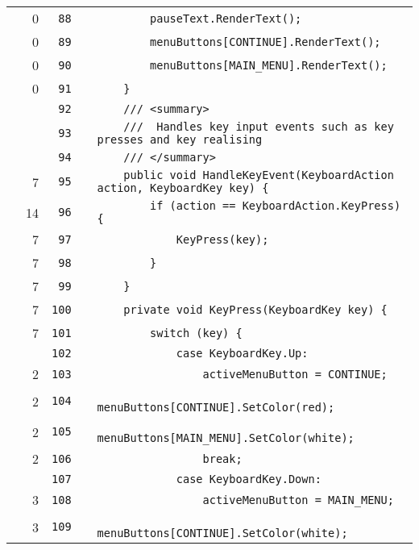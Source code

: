 \documentclass[a4paper,landscape,10pt]{article}
\begin{document}
\begin{longtable}[l]{lrrll}
\cellcolor{red} & 0 & \verb~88~ & & \verb~        pauseText.RenderText();~\\
\cellcolor{red} & 0 & \verb~89~ & & \verb~        menuButtons[CONTINUE].RenderText();~\\
\cellcolor{red} & 0 & \verb~90~ & & \verb~        menuButtons[MAIN_MENU].RenderText();~\\
\cellcolor{red} & 0 & \verb~91~ & & \verb~    }~\\
\cellcolor{gray} &  & \verb~92~ & & \verb~    /// <summary>~\\
\cellcolor{gray} &  & \verb~93~ & & \verb~    ///  Handles key input events such as key presses and key realising~\\
\cellcolor{gray} &  & \verb~94~ & & \verb~    /// </summary>~\\
\cellcolor{green} & 7 & \verb~95~ & & \verb~    public void HandleKeyEvent(KeyboardAction action, KeyboardKey key) {~\\
\cellcolor{green} & 14 & \verb~96~ & & \verb~        if (action == KeyboardAction.KeyPress) {~\\
\cellcolor{green} & 7 & \verb~97~ & & \verb~            KeyPress(key);~\\
\cellcolor{green} & 7 & \verb~98~ & & \verb~        }~\\
\cellcolor{green} & 7 & \verb~99~ & & \verb~    }~\\
\cellcolor{green} & 7 & \verb~100~ & & \verb~    private void KeyPress(KeyboardKey key) {~\\
\cellcolor{green} & 7 & \verb~101~ & & \verb~        switch (key) {~\\
\cellcolor{gray} &  & \verb~102~ & & \verb~            case KeyboardKey.Up:~\\
\cellcolor{green} & 2 & \verb~103~ & & \verb~                activeMenuButton = CONTINUE;~\\
\cellcolor{green} & 2 & \verb~104~ & & \verb~                menuButtons[CONTINUE].SetColor(red);~\\
\cellcolor{green} & 2 & \verb~105~ & & \verb~                menuButtons[MAIN_MENU].SetColor(white);~\\
\cellcolor{green} & 2 & \verb~106~ & & \verb~                break;~\\
\cellcolor{gray} &  & \verb~107~ & & \verb~            case KeyboardKey.Down:~\\
\cellcolor{green} & 3 & \verb~108~ & & \verb~                activeMenuButton = MAIN_MENU;~\\
\cellcolor{green} & 3 & \verb~109~ & & \verb~                menuButtons[CONTINUE].SetColor(white);~\\

\end{longtable}
\end{document}
